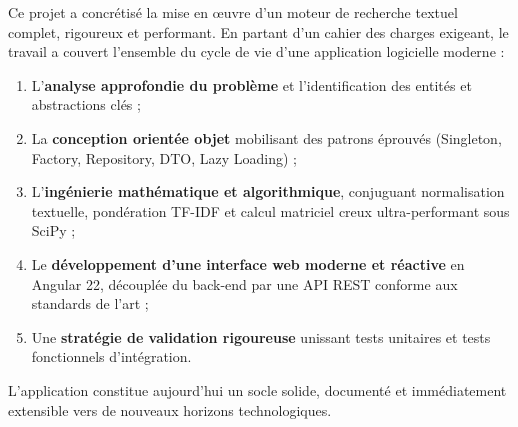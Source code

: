 \documentclass[12pt,a4paper]{article}
\begin{document}
Ce projet a concrétisé la mise en œuvre d'un moteur de recherche textuel complet, rigoureux et performant. En partant d'un cahier des charges exigeant, le travail a couvert l'ensemble du cycle de vie d'une application logicielle moderne :
\begin{enumerate}
    \item L'\textbf{analyse approfondie du problème} et l'identification des entités et abstractions clés ;
    \item La \textbf{conception orientée objet} mobilisant des patrons éprouvés (Singleton, Factory, Repository, DTO, Lazy Loading) ;
    \item L'\textbf{ingénierie mathématique et algorithmique}, conjuguant normalisation textuelle, pondération TF-IDF et calcul matriciel creux ultra-performant sous SciPy ;
    \item Le \textbf{développement d'une interface web moderne et réactive} en Angular 22, découplée du back-end par une API REST conforme aux standards de l'art ;
    \item Une \textbf{stratégie de validation rigoureuse} unissant tests unitaires et tests fonctionnels d'intégration.
\end{enumerate}

L'application constitue aujourd'hui un socle solide, documenté et immédiatement extensible vers de nouveaux horizons technologiques.
\end{document}
